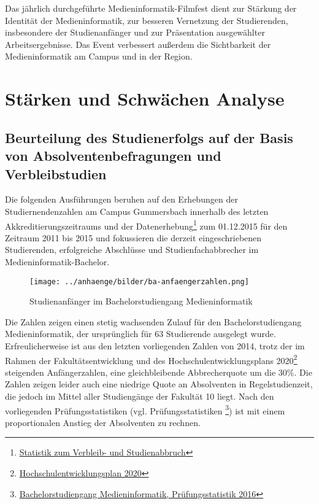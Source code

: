 Das jährlich durchgeführte Medieninformatik-Filmfest dient zur Stärkung
der Identität der Medieninformatik, zur besseren Vernetzung der
Studierenden, insbesondere der Studienanfänger und zur Präsentation
ausgewählter Arbeitsergebnisse. Das Event verbessert außerdem die
Sichtbarkeit der Medieninformatik am Campus und in der Region.

\section{Stärken und Schwächen
Analyse\label{/mi-2017/selbstbericht/0100-ist-zustand/0100-ist-zustand}}\label{stuxe4rken-und-schwuxe4chen-analysepathlabelmi-2017selbstbericht0100-ist-zustand0100-ist-zustand}

\subsection{Beurteilung des Studienerfolgs auf der Basis von
Absolventenbefragungen und
Verbleibstudien\label{/mi-2017/selbstbericht/0100-ist-zustand/0100-ist-zustand}}\label{beurteilung-des-studienerfolgs-auf-der-basis-von-absolventenbefragungen-und-verbleibstudienpathlabelmi-2017selbstbericht0100-ist-zustand0100-ist-zustand}

Die folgenden Ausführungen beruhen auf den Erhebungen der
Studiernendenzahlen am Campus Gummersbach innerhalb des letzten
Akkreditierungszeitraums und der Datenerhebung\footnote{\href{https://th-koeln.github.io/mi-2017/anhaenge/stat-verbleib-und-studienabbruch.pdf}{Statistik
  zum Verbleib- und Studienabbruch}} zum 01.12.2015 für den Zeitraum
2011 bis 2015 und fokussieren die derzeit eingeschriebenen Studierenden,
erfolgreiche Abschlüsse und Studienfachabbrecher im
Medieninformatik-Bachelor.

\begin{figure}[htbp]
\centering
\texttt{[image: ../anhaenge/bilder/ba-anfaengerzahlen.png]}
\caption{Studienanfänger im Bachelorstudiengang Medieninformatik}
\end{figure}

Die Zahlen zeigen einen stetig wachsenden Zulauf für den
Bachelorstudiengang Medieninformatik, der ursprünglich für 63
Studierende ausgelegt wurde. Erfreulicherweise ist aus den letzten
vorliegenden Zahlen von 2014, trotz der im Rahmen der
Fakultätsentwicklung und des Hochschulentwicklungsplans 2020\footnote{\href{https://www.verwaltung.th-koeln.de/imperia/md/content/verwaltung/broschueren_leitfaeden/hochschulentwicklungsplan2020.pdf}{Hochschulentwicklungsplan
  2020}} steigenden Anfängerzahlen, eine gleichbleibende Abbrecherquote
um die 30\%. Die Zahlen zeigen leider auch eine niedrige Quote an
Absolventen in Regelstudienzeit, die jedoch im Mittel aller Studiengänge
der Fakultät 10 liegt. Nach den vorliegenden Prüfungsstatistiken (vgl.
Prüfungsstatistiken \footnote{\href{https://th-koeln.github.io/mi-2017/anhaenge/ba-pruefungsstatistiken.pdf}{Bachelorstudiengang
  Medieninformatik, Prüfungsstatistik 2016}}) ist mit einem
proportionalen Anstieg der Absolventen zu rechnen.

